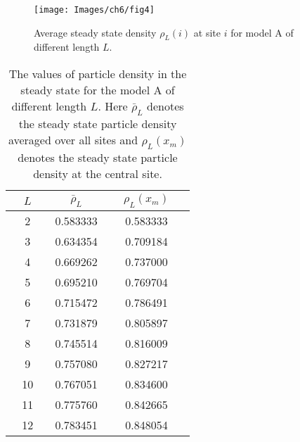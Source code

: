 \documentclass[11pt,a4paper]{book}
\begin{document}
\begin{figure}
  \begin{center}
    \texttt{[image: Images/ch6/fig4]}
    \caption{Average steady state density $\rho_{L}(i)$ at site $i$ for
model A of different length $L$.}
    \label{fig4}
  \end{center}
\end{figure}
\begin{table}
  \begin{center}
    \begin{tabular}{|c|c|c|}
      \hline
      $ ~ ~ ~ ~ ~ L ~ ~ ~ ~ ~ $ & $ ~ ~ ~ ~ ~ ~ \bar{\rho}_L ~ ~ ~ ~ ~ ~ $ & $ ~ ~ ~ ~ ~ ~ \rho_L(x_m) ~ ~ ~ ~ ~ ~ $ \\
      \hline
      2 & 0.583333 & 0.583333 \\
      \hline
      3 & 0.634354 & 0.709184 \\
      \hline
      4 & 0.669262 & 0.737000 \\
      \hline
      5 & 0.695210 & 0.769704 \\
      \hline
      6 & 0.715472 & 0.786491 \\
      \hline
      7 & 0.731879 & 0.805897 \\
      \hline
      8 & 0.745514 & 0.816009 \\
      \hline
      9 & 0.757080 & 0.827217 \\
      \hline
      10 & 0.767051 & 0.834600 \\
      \hline
      11 & 0.775760 & 0.842665 \\
      \hline
      12 & 0.783451 & 0.848054 \\
      \hline
    \end{tabular}
    \caption{The values of particle density in the steady state 
    for the model A of different length $L$. Here $\bar{\rho}_L$ denotes the
    steady state particle density averaged over all sites and $\rho_L(x_m)$ denotes the
    steady state particle density at the central site.}
  \end{center}
  \label{second}
\end{table}
\end{document}

